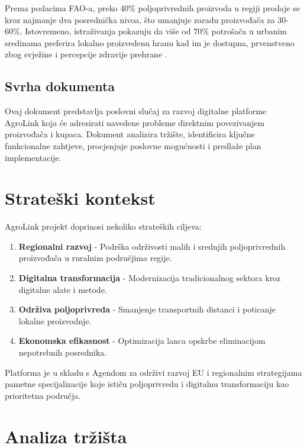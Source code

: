 \documentclass[a4paper,12pt]{article}
\begin{document}
Prema podacima FAO-a, preko 40\% poljoprivrednih proizvoda u regiji prodaje se kroz najmanje dva posrednička nivoa, što umanjuje zaradu proizvođača za 30-60\%. Istovremeno, istraživanja pokazuju da više od 70\% potrošača u urbanim sredinama preferira lokalno proizvedenu hranu kad im je dostupna, prvenstveno zbog svježine i percepcije zdravije prehrane \cite{FAO2021}.

\subsection{Svrha dokumenta}
Ovaj dokument predstavlja poslovni slučaj za razvoj digitalne platforme AgroLink koja će adresirati navedene probleme direktnim povezivanjem proizvođača i kupaca. Dokument analizira tržište, identificira ključne funkcionalne zahtjeve, procjenjuje poslovne mogućnosti i predlaže plan implementacije.

\section{Strateški kontekst}
\label{sec:strateski-kontekst}

AgroLink projekt doprinosi nekoliko strateških ciljeva:

\begin{enumerate}
    \item \textbf{Regionalni razvoj} - Podrška održivosti malih i srednjih poljoprivrednih proizvođača u ruralnim područjima regije.
    \item \textbf{Digitalna transformacija} - Modernizacija tradicionalnog sektora kroz digitalne alate i metode.
    \item \textbf{Održiva poljoprivreda} - Smanjenje transportnih distanci i poticanje lokalne proizvodnje.
    \item \textbf{Ekonomska efikasnost} - Optimizacija lanca opskrbe eliminacijom nepotrebnih posrednika.
\end{enumerate}

Platforma je u skladu s Agendom za održivi razvoj EU i regionalnim strategijama pametne specijalizacije koje ističu poljoprivredu i digitalnu transformaciju kao prioritetna područja.

\section{Analiza tržišta}
\label{sec:analiza-trzista}
\end{document}
